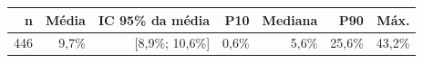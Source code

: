 \begin{tabular}{rrrrrrr}
\toprule
n & Média & IC 95\% da média & P10 & Mediana & P90 & Máx. \\
\midrule
446 & 9,7\% & [8,9\%; 10,6\%] & 0,6\% & 5,6\% & 25,6\% & 43,2\% \\
\bottomrule
\end{tabular}
